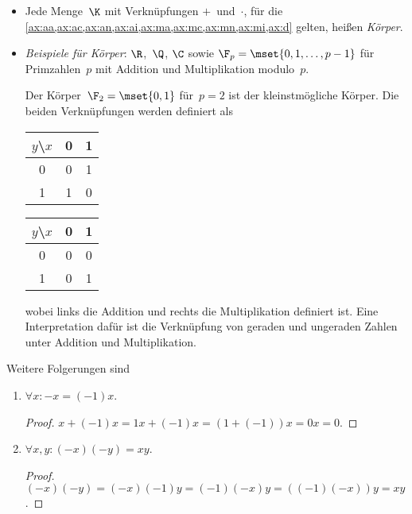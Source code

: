 \documentclass[a4paper]{article}
\begin{document}
\begin{remark}\leavevmode
    \begin{itemize}
        \item Jede Menge~$\K$ mit Verknüpfungen $+$~und~$\cdot$, für die \cref{ax:aa,ax:ac,ax:an,ax:ai,ax:ma,ax:mc,ax:mn,ax:mi,ax:d} gelten, heißen \emph{Körper}.
        \item \emph{Beispiele für Körper}: $\R$,~$\Q$, $\C$ sowie $\F_p = \mset{0, 1, \dots, p-1}$ für Primzahlen~$p$ mit Addition und Multiplikation modulo~$p$.

              Der Körper~$\F_2 = \mset{0, 1}$ für~$p = 2$ ist der kleinstmögliche Körper. Die beiden Verknüpfungen werden definiert als
              \begin{center}
                  \hspace*{\fill}
                  \begin{tabular}{@{}c|cc@{}}
                      $y$\textbackslash$x$ & 0 & 1 \\\hline
                      0                    & 0 & 1 \\
                      1                    & 1 & 0
                  \end{tabular}
                  \hfill
                  \begin{tabular}{@{}c|cc@{}}
                      $y$\textbackslash$x$ & 0 & 1 \\\hline
                      0                    & 0 & 0 \\
                      1                    & 0 & 1
                  \end{tabular}
                  \hspace*{\fill}
              \end{center}
              wobei links die Addition und rechts die Multiplikation definiert ist. Eine Interpretation dafür ist die Verknüpfung von geraden und ungeraden Zahlen unter Addition und Multiplikation.
    \end{itemize}
\end{remark}


Weitere Folgerungen sind
\begin{enumerate}[resume*=conclusions]
    \item $\forall x\colon -x = (-1) x$.
          \begin{proof}
              $x + (-1)x = 1x + (-1)x = (1 + (-1)) x = 0x = 0$.
          \end{proof}
    \item $\forall x, y\colon (-x) (-y) = x y$.
          \begin{proof}
              $(-x) (-y) = (-x) (-1) y = (-1) (-x) y = ((-1) (-x)) y = x y$.
          \end{proof}
\end{enumerate}
\end{document}
